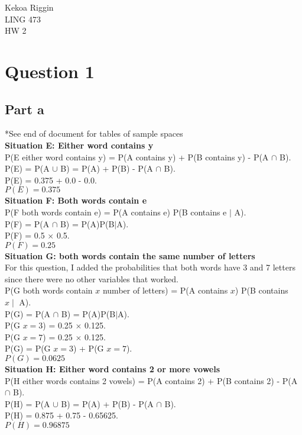\documentclass[11pt]{article}
\begin{document}
\noindent
Kekoa Riggin\\
LING 473\\
HW 2

\section*{Question 1}

\subsection*{Part a}
\noindent
*See end of document for tables of sample spaces\\

\noindent
\textbf{Situation E: Either word contains y}\\
P(E either word contains y) = P(A contains y) + P(B contains y) - P(A $\cap$ B). \\
P(E) = P(A $\cup$ B) = P(A) + P(B) - P(A $\cap$ B). \\
P(E) = 0.375 + 0.0 - 0.0. \\
$ P(E)= 0.375 $ \\

\noindent
\textbf{Situation F: Both words contain e}\\
P(F both words contain e) = P(A contains e) P(B contains e $\mid$ A). \\
P(F) = P(A $\cap$ B) = P(A)P(B$\mid$A). \\
P(F) = 0.5 $\times$ 0.5. \\
$ P(F)= 0.25$ \\

\noindent
\textbf{Situation G: both words contain the same number of letters}\\
For this question, I added the probabilities that both words have 3 and 7 letters since there were no other variables that worked.\\ 
P(G both words contain $x$ number of letters) = P(A contains $x$) P(B contains $x \mid$ A). \\
P(G) = P(A $\cap$ B) = P(A)P(B$\mid$A). \\
P(G $x=3$) = 0.25 $\times$ 0.125. \\
P(G $x=7$) = 0.25 $\times$ 0.125. \\
P(G) = P(G $x=3$) + P(G $x=7$). \\
$ P(G)= 0.0625$ \\

\noindent
\textbf{Situation H: Either word contains 2 or more vowels}\\
P(H either words contains 2 vowels) = P(A contains 2) + P(B contains 2) - P(A $\cap$ B). \\
P(H) = P(A $\cup$ B) = P(A) + P(B) - P(A $\cap$ B). \\
P(H) = 0.875 + 0.75 - 0.65625. \\
$ P(H)= 0.96875$ \\
\end{document}
